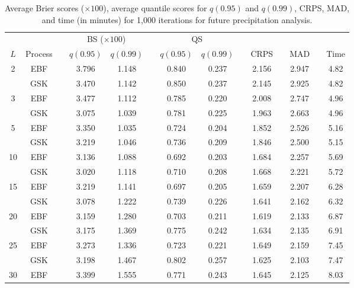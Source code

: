 \documentclass[aoas]{imsart}
\begin{document}
\begin{table}[htbp]
	\caption{Average Brier scores ($\times 100$), average quantile scores for $q(0.95)$ and $q(0.99)$, CRPS, MAD, and time (in minutes) for 1,000 iterations for future precipitation analysis.}
	\label{ebtbl:precip-scores}
	\footnotesize
	\centering
	\begin{tabular}{cc c cc c cc c c c c c c}
		\toprule
		& && \multicolumn{2}{c}{BS ($\times 100$)} && \multicolumn{2}{c}{QS} &&&&&& \\
		\cmidrule{4-5} \cmidrule{7-8}
		$L$ & Process & \phantom{a} & $q(0.95)$ & $q(0.99)$ & \phantom{a} & $q(0.95)$ & $q(0.99)$ & \phantom{a} & CRPS & \phantom{a} & MAD & \phantom{a} & Time\\
		\midrule																	
2	&	EBF	&&	3.796	&	1.148	&&	0.840	&	0.237	&&	2.156	&&	2.947	&&	4.82	\\
	&	GSK	&&	3.470	&	1.142	&&	0.850	&	0.237	&&	2.145	&&	2.925	&&	4.82	\\
\midrule																	
3	&	EBF	&&	3.477	&	1.112	&&	0.785	&	0.220	&&	2.008	&&	2.747	&&	4.96	\\
	&	GSK	&&	3.075	&	1.039	&&	0.781	&	0.225	&&	1.963	&&	2.663	&&	4.96	\\
\midrule																	
5	&	EBF	&&	3.350	&	1.035	&&	0.724	&	0.204	&&	1.852	&&	2.526	&&	5.16	\\
	&	GSK	&&	3.219	&	1.046	&&	0.736	&	0.209	&&	1.846	&&	2.500	&&	5.15	\\
\midrule																	
10	&	EBF	&&	3.136	&	1.088	&&	0.692	&	0.203	&&	1.684	&&	2.257	&&	5.69	\\
	&	GSK	&&	3.020	&	1.118	&&	0.710	&	0.208	&&	1.668	&&	2.221	&&	5.72	\\
\midrule																	
15	&	EBF	&&	3.219	&	1.141	&&	0.697	&	0.205	&&	1.659	&&	2.207	&&	6.28	\\
	&	GSK	&&	3.078	&	1.222	&&	0.739	&	0.226	&&	1.641	&&	2.162	&&	6.32	\\
\midrule																	
20	&	EBF	&&	3.159	&	1.280	&&	0.703	&	0.211	&&	1.619	&&	2.133	&&	6.87	\\
	&	GSK	&&	3.175	&	1.369	&&	0.775	&	0.242	&&	1.634	&&	2.135	&&	6.91	\\
\midrule																	
25	&	EBF	&&	3.273	&	1.336	&&	0.723	&	0.221	&&	1.649	&&	2.159	&&	7.45	\\
	&	GSK	&&	3.198	&	1.467	&&	0.802	&	0.257	&&	1.625	&&	2.103	&&	7.47	\\
\midrule																	
30	&	EBF	&&	3.399	&	1.555	&&	0.771	&	0.243	&&	1.645	&&	2.125	&&	8.03	\\

\end{tabular}
\end{table}
\end{document}
